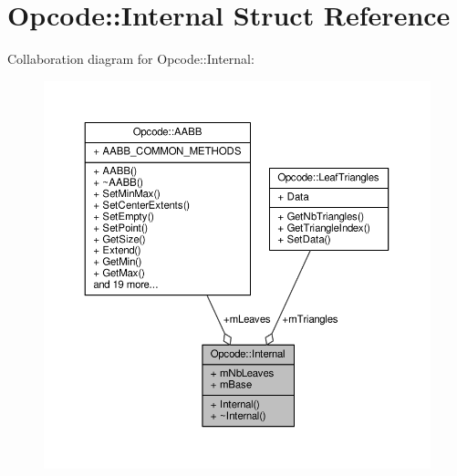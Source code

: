 \hypertarget{structOpcode_1_1Internal}{}\section{Opcode\+:\+:Internal Struct Reference}
\label{structOpcode_1_1Internal}


Collaboration diagram for Opcode\+:\+:Internal\+:
\nopagebreak
\begin{figure}[H]
\begin{center}
\leavevmode
\includegraphics[width=350pt]{d3/d3a/structOpcode_1_1Internal__coll__graph}
\end{center}
\end{figure}
